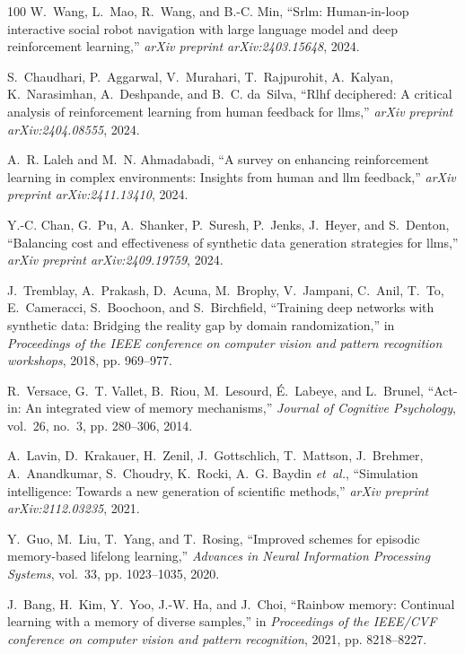 \documentclass[10pt,journal,compsoc]{IEEEtran}
\begin{document}
\begin{thebibliography}{100}
	W.~Wang, L.~Mao, R.~Wang, and B.-C. Min, ``Srlm: Human-in-loop interactive
	social robot navigation with large language model and deep reinforcement
	learning,'' \emph{arXiv preprint arXiv:2403.15648}, 2024.
	
	S.~Chaudhari, P.~Aggarwal, V.~Murahari, T.~Rajpurohit, A.~Kalyan,
	K.~Narasimhan, A.~Deshpande, and B.~C. da~Silva, ``Rlhf deciphered: A
	critical analysis of reinforcement learning from human feedback for llms,''
	\emph{arXiv preprint arXiv:2404.08555}, 2024.
	
	A.~R. Laleh and M.~N. Ahmadabadi, ``A survey on enhancing reinforcement
	learning in complex environments: Insights from human and llm feedback,''
	\emph{arXiv preprint arXiv:2411.13410}, 2024.
	
	Y.-C. Chan, G.~Pu, A.~Shanker, P.~Suresh, P.~Jenks, J.~Heyer, and S.~Denton,
	``Balancing cost and effectiveness of synthetic data generation strategies
	for llms,'' \emph{arXiv preprint arXiv:2409.19759}, 2024.
	
	J.~Tremblay, A.~Prakash, D.~Acuna, M.~Brophy, V.~Jampani, C.~Anil, T.~To,
	E.~Cameracci, S.~Boochoon, and S.~Birchfield, ``Training deep networks with
	synthetic data: Bridging the reality gap by domain randomization,'' in
	\emph{Proceedings of the IEEE conference on computer vision and pattern
		recognition workshops}, 2018, pp. 969--977.
	
	R.~Versace, G.~T. Vallet, B.~Riou, M.~Lesourd, {\'E}.~Labeye, and L.~Brunel,
	``Act-in: An integrated view of memory mechanisms,'' \emph{Journal of
		Cognitive Psychology}, vol.~26, no.~3, pp. 280--306, 2014.
	
	A.~Lavin, D.~Krakauer, H.~Zenil, J.~Gottschlich, T.~Mattson, J.~Brehmer,
	A.~Anandkumar, S.~Choudry, K.~Rocki, A.~G. Baydin \emph{et~al.}, ``Simulation
	intelligence: Towards a new generation of scientific methods,'' \emph{arXiv
		preprint arXiv:2112.03235}, 2021.
	
	Y.~Guo, M.~Liu, T.~Yang, and T.~Rosing, ``Improved schemes for episodic
	memory-based lifelong learning,'' \emph{Advances in Neural Information
		Processing Systems}, vol.~33, pp. 1023--1035, 2020.
	
	J.~Bang, H.~Kim, Y.~Yoo, J.-W. Ha, and J.~Choi, ``Rainbow memory: Continual
	learning with a memory of diverse samples,'' in \emph{Proceedings of the
		IEEE/CVF conference on computer vision and pattern recognition}, 2021, pp.
	8218--8227.
	

\end{thebibliography}
\end{document}
